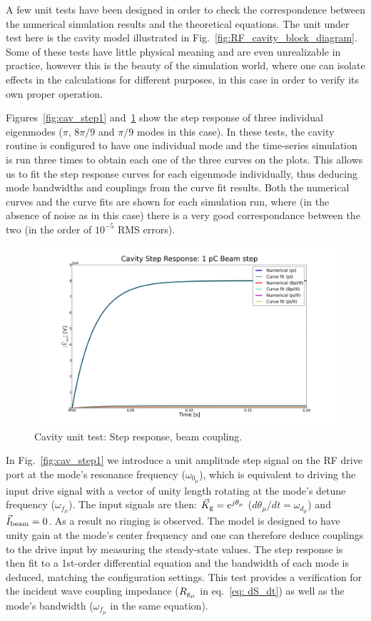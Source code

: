 \documentclass[a4paper,12pt]{article}
\begin{document}
A few unit tests have been designed in order to check the correspondence between the numerical simulation results and the theoretical equations. The unit under test here is the cavity model illustrated in Fig.~\ref{fig:RF_cavity_block_diagram}. Some of these tests have little physical meaning and are even unrealizable in practice, however this is the beauty of the simulation world, where one can isolate effects in the calculations for different purposes, in this case in order to verify its own proper operation.

Figures~\ref{fig:cav_step1} and~\ref{fig:cav_step2} show the step response of three individual eigenmodes ($\pi$, $8\pi/9$ and $\pi/9$ modes in this case). In these tests, the cavity routine is configured to have one individual mode and the time-series simulation is run three times to obtain each one of the three curves on the plots. This allows us to fit the step response curves for each eigenmode individually, thus deducing mode bandwidths and couplings from the curve fit results. Both the numerical curves and the curve fits are shown for each simulation run, where (in the absence of noise as in this case) there is a very good correspondance between the two (in the order of $10^{-5}$ RMS errors).

\begin{figure}
\centering
\includegraphics[scale=0.26]{../figures/cavity_test_beam.png}
\caption{Cavity unit test: Step response, beam coupling.}
\label{fig:cav_step2}
\end{figure}

In Fig.~\ref{fig:cav_step1} we introduce a unit amplitude step signal on the RF drive port at the mode's resonance frequency ($\omega_{0_{\mu}}$), which is equivalent to driving the input drive signal with a vector of unity length rotating at the mode's detune frequency ($\omega_{f_{\mu}}$). The input signals are then: $\vec K_{\rm g}=e^{j\theta_{\mu}}$ ($d\theta_{\mu}/dt = \omega_{d_\mu}$) and $\vec I_{\rm beam}=0$. As a result no ringing is observed. The model is designed to have unity gain at the mode's center frequency and one can therefore deduce couplings to the drive input by measuring the steady-state values. The step response is then fit to a 1st-order differential equation and the bandwidth of each mode is deduced, matching the configuration settings. This test provides a verification for the incident wave coupling impedance ($R_{\rm g_{\mu}}$ in eq.~\ref{eq: dS_dt}) as well as the mode's bandwidth ($\omega_{f_{\mu}}$ in the same equation).
\end{document}
